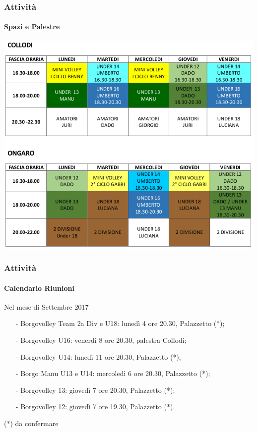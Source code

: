 \documentclass{beamer}
\begin{document}
\begin{frame}
\frametitle{Attività}
\framesubtitle{Spazi e Palestre}
\begin{center}
\includegraphics[scale=0.47]{palestre2017-18.jpg}
\end{center}
\end{frame}


\begin{frame}
\frametitle{Attività}
\framesubtitle{Calendario Riunioni}
\begin{block}{Nel mese di Settembre 2017}
\begin{itemize}
\item[-]Borgovolley Team 2a Div e U18: lunedì 4 ore 20.30, Palazzetto (*);
\item[-]Borgovolley U16: venerdì 8 ore 20.30, palestra Collodi;
\item[-]Borgovolley U14: lunedì 11 ore 20.30, Palazzetto (*);
\item[-]Borgo Manu U13 e U14: mercoledì 6 ore 20.30, Palazzetto (*);
\item[-]Borgovolley 13: giovedì 7 ore 20.30,  Palazzetto (*);
\item[-]Borgovolley 12: giovedì 7 ore 19.30, Palazzetto (*).
\end{itemize}
\end{block}

(*) da confermare
\end{frame}
\end{document}
